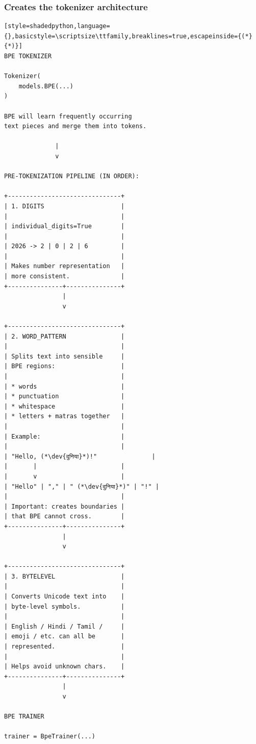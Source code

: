 \subsubsection*{Creates the tokenizer architecture}

\begin{lstlisting}[style=shadedpython,language={},basicstyle=\scriptsize\ttfamily,breaklines=true,escapeinside={(*}{*)}]
BPE TOKENIZER

Tokenizer(
    models.BPE(...)
)

BPE will learn frequently occurring
text pieces and merge them into tokens.

              |
              v

PRE-TOKENIZATION PIPELINE (IN ORDER):

+-------------------------------+
| 1. DIGITS                     |
|                               |
| individual_digits=True        |
|                               |
| 2026 -> 2 | 0 | 2 | 6         |
|                               |
| Makes number representation   |
| more consistent.              |
+---------------+---------------+
                |
                v

+-------------------------------+
| 2. WORD_PATTERN               |
|                               |
| Splits text into sensible     |
| BPE regions:                  |
|                               |
| * words                       |
| * punctuation                 |
| * whitespace                  |
| * letters + matras together   |
|                               |
| Example:                      |
|                               |
| "Hello, (*\dev{दुनिया}*)!"               |
|       |                       |
|       v                       |
| "Hello" | "," | " (*\dev{दुनिया}*)" | "!" |
|                               |
| Important: creates boundaries |
| that BPE cannot cross.        |
+---------------+---------------+
                |
                v

+-------------------------------+
| 3. BYTELEVEL                  |
|                               |
| Converts Unicode text into    |
| byte-level symbols.           |
|                               |
| English / Hindi / Tamil /     |
| emoji / etc. can all be       |
| represented.                  |
|                               |
| Helps avoid unknown chars.    |
+---------------+---------------+
                |
                v

BPE TRAINER

trainer = BpeTrainer(...)


\end{lstlisting}
